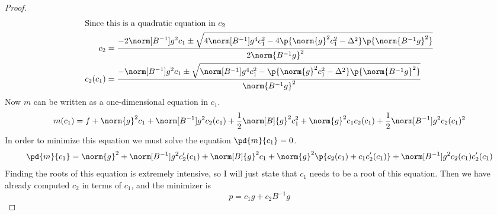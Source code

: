\documentclass[11pt, oneside]{article}
\begin{document}
\begin{enumerate}
\begin{proof}
\begin{align*}
        \intertext{Since this is a quadratic equation in $c_2$}
        c_2 &= \frac{-2 \norm[B^{-1}]{g}^2 c_1 \pm \sqrt{4 \norm[B^{-1}]{g}^4 c_1^2 - 4\p{\norm{g}^2 c_1^2 - \Delta^2}\p{\norm{B^{-1} g}^2}}}{2\norm{B^{-1} g}^2} \\
        c_2(c_1) &= \frac{-\norm[B^{-1}]{g}^2 c_1 \pm \sqrt{\norm[B^{-1}]{g}^4 c_1^2 - \p{\norm{g}^2 c_1^2 - \Delta^2}\p{\norm{B^{-1} g}^2}}}{\norm{B^{-1} g}^2}
      \end{align*}
      Now $m$ can be written as a one-dimensional equation in $c_1$.
      \[
        m(c_1) = f + \norm{g}^2 c_1 + \norm[B^{-1}]{g}^2 c_2(c_1) + \frac{1}{2} \norm[B]{g}^2 c_1^2 + \norm{g}^2 c_1 c_2(c_1) + \frac{1}{2} \norm[B^{-1}]{g}^2 c_2(c_1)^2
      \]
      In order to minimize this equation we must solve the equation $\pd{m}{c_1} = 0$.
      \[
        \pd{m}{c_1} = \norm{g}^2 + \norm[B^{-1}]{g}^2 c_2'(c_1) + \norm[B]{g}^2 c_1 + \norm{g}^2 \p{c_2(c_1) + c_1 c_2'(c_1)} + \norm[B^{-1}]{g}^2 c_2(c_1) c_2'(c_1)
      \]
      Finding the roots of this equation is extremely intensive, so I will just
      state that $c_1$ needs to be a root of this equation.
      Then we have already computed $c_2$ in terms of $c_1$, and the minimizer is
      \[
        p = c_1 g + c_2 B^{-1}g
      \]

    \end{proof}


\end{enumerate}
\end{document}
